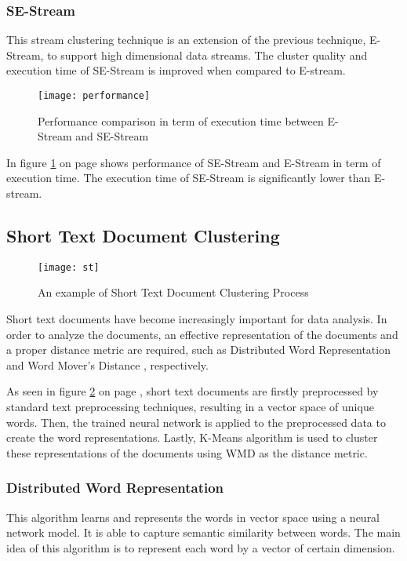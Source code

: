 \documentclass{IEEEtran}
\begin{document}
\subsubsection{SE-Stream}
This stream clustering technique is an extension of the previous technique, E-Stream, to support high dimensional data streams. The cluster quality and execution time of SE-Stream is improved when compared to E-stream. 

\begin{figure}[hp]
\centering
\texttt{[image: performance]}
\caption{Performance comparison in term of execution time between E-Stream and SE-Stream}
\label{fig:perf1}
\end{figure}

In figure \ref{fig:perf1} on page \pageref{fig:perf1} shows performance of SE-Stream and E-Stream in term of execution time. The execution time of SE-Stream is significantly lower than E-stream.


\subsection{Short Text Document Clustering}

\begin{figure}[hp]
\centering
\texttt{[image: st]}
\caption{An example of Short Text Document Clustering Process}
\label{fig:st1}
\end{figure}

Short text documents have become increasingly important for data analysis. In order to analyze the documents, an effective representation of the documents and a proper distance metric are required, such as Distributed Word Representation and Word Mover's Distance \cite{SText}, respectively.

As seen in figure \ref{fig:st1} on page \pageref{fig:st1}, short text documents are firstly preprocessed by standard text preprocessing techniques, resulting in a vector space of unique words. Then, the trained neural network is applied to the preprocessed data to create the word representations. Lastly, K-Means algorithm is used to cluster these representations of the documents using WMD as the distance metric.

\subsubsection{Distributed Word Representation}
This algorithm learns and represents the words in vector space using a neural network model. It is able to capture semantic similarity between words. The main idea of this algorithm is to represent each word by a vector of certain dimension.
\end{document}

